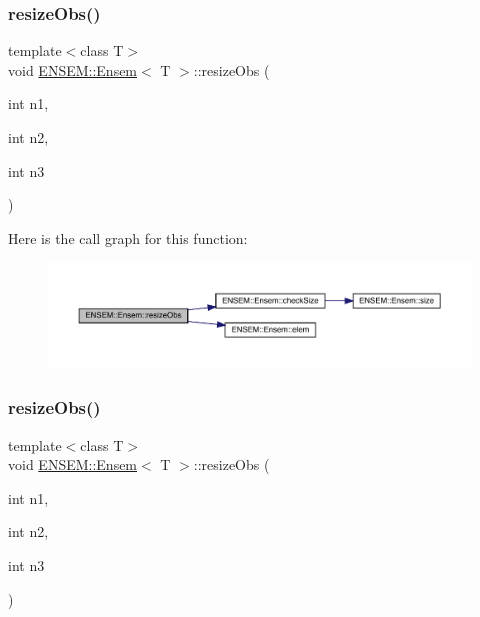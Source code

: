 \subsubsection{\texorpdfstring{resizeObs()}{resizeObs()}\hspace{0.1cm}{\footnotesize\ttfamily [7/12]}}
{\footnotesize\ttfamily template$<$class T$>$ \\
void \mbox{\hyperlink{classENSEM_1_1Ensem}{E\+N\+S\+E\+M\+::\+Ensem}}$<$ T $>$\+::resize\+Obs (\begin{DoxyParamCaption}\item[{int}]{n1,  }\item[{int}]{n2,  }\item[{int}]{n3 }\end{DoxyParamCaption})\hspace{0.3cm}{\ttfamily [inline]}}

Here is the call graph for this function\+:
\nopagebreak
\begin{figure}[H]
\begin{center}
\leavevmode
\includegraphics[width=350pt]{d7/d3e/classENSEM_1_1Ensem_a8d63351cad23f2af13f26c7326d1abcf_cgraph}
\end{center}
\end{figure}
\mbox{\label{classENSEM_1_1Ensem_a8d63351cad23f2af13f26c7326d1abcf}} 
\subsubsection{\texorpdfstring{resizeObs()}{resizeObs()}\hspace{0.1cm}{\footnotesize\ttfamily [8/12]}}
{\footnotesize\ttfamily template$<$class T$>$ \\
void \mbox{\hyperlink{classENSEM_1_1Ensem}{E\+N\+S\+E\+M\+::\+Ensem}}$<$ T $>$\+::resize\+Obs (\begin{DoxyParamCaption}\item[{int}]{n1,  }\item[{int}]{n2,  }\item[{int}]{n3 }\end{DoxyParamCaption})\hspace{0.3cm}{\ttfamily [inline]}}

